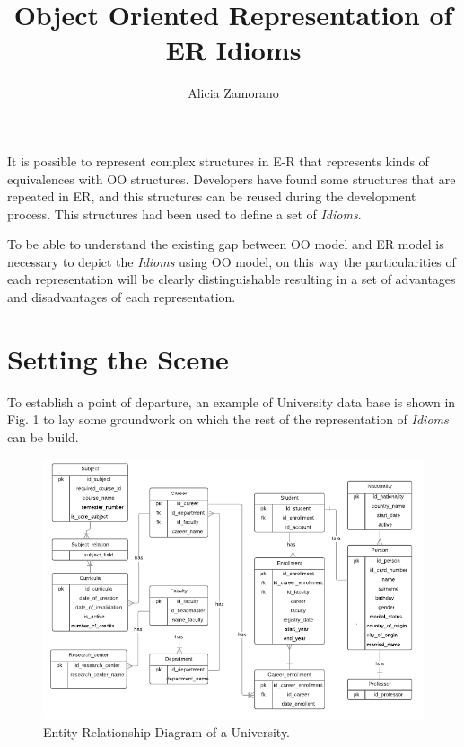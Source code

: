 \documentclass{article}
\begin{document}
\title{Object Oriented Representation of ER Idioms}
\author{Alicia Zamorano}
\maketitle
It is possible to represent complex structures in E-R that represents kinds of
equivalences with OO structures. Developers have found some structures that are
repeated in ER, and this structures can be reused during the development process.
This structures had been used to define a set of \textit{Idioms}\cite{ER_Idioms}.

To be able to understand the existing gap between OO model and ER model is
necessary to depict the \textit{Idioms} using OO model, on this way the
particularities of each representation will be clearly distinguishable resulting
in a set of advantages and disadvantages of each representation.

\section{Setting the Scene}
To establish a point of departure, an example of University data base is shown
in Fig. 1 to lay some groundwork on which the rest of the representation of
\textit{Idioms} can be build.

\begin{figure}
	\centering
	\includegraphics[width=15cm]{universityerdidioms}
	\caption{Entity Relationship Diagram of a University.}
\end{figure}
\end{document}
